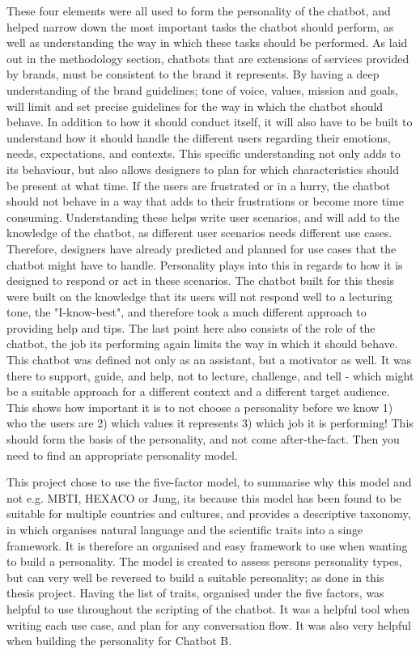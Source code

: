 These four elements were all used to form the personality of the chatbot, and helped narrow down the most important tasks the chatbot should perform, as well as understanding the way in which these tasks should be performed. As laid out in the methodology section, chatbots that are extensions of services provided by brands, must be consistent to the brand it represents. By having a deep understanding of the brand guidelines; tone of voice, values, mission and goals, will limit and set precise guidelines for the way in which the chatbot should behave. In addition to how it should conduct itself, it will also have to be built to understand how it should handle the different users regarding their emotions, needs, expectations, and contexts. This specific understanding not only adds to its behaviour, but also allows designers to plan for which characteristics should be present at what time. If the users are frustrated or in a hurry, the chatbot should not behave in a way that adds to their frustrations or become more time consuming. Understanding these helps write user scenarios, and will add to the knowledge of the chatbot, as different user scenarios needs different use cases. Therefore, designers have already predicted and planned for use cases that the chatbot might have to handle. Personality plays into this in regards to how it is designed to respond or act in these scenarios. The chatbot built for this thesis were built on the knowledge that its users will not respond well to a lecturing tone, the "I-know-best", and therefore took a much different approach to providing help and tips. The last point here also consists of the role of the chatbot, the job its performing again limits the way in which it should behave. This chatbot was defined not only as an assistant, but a motivator as well. It was there to support, guide, and help, not to lecture, challenge, and tell - which might be a suitable approach for a different context and a different target audience. This shows how important it is to not choose a personality before we know 1) who the users are 2) which values it represents 3) which job it is performing! This should form the basis of the personality, and not come after-the-fact. Then you need to find an appropriate personality model. 

This project chose to use the five-factor model, to summarise why this model and not e.g. MBTI, HEXACO or Jung, its because this model has been found to be suitable for multiple countries and cultures, and provides a descriptive taxonomy, in which organises natural language and the scientific traits into a singe framework. It is therefore an organised and easy framework to use when wanting to build a personality. The model is created to assess persons personality types, but can very well be reversed to build a suitable personality; as done in this thesis project. Having the list of traits, organised under the five factors, was helpful to use throughout the scripting of the chatbot. It was a helpful tool when writing each use case, and plan for any conversation flow. It was also very helpful when building the personality for Chatbot B.

